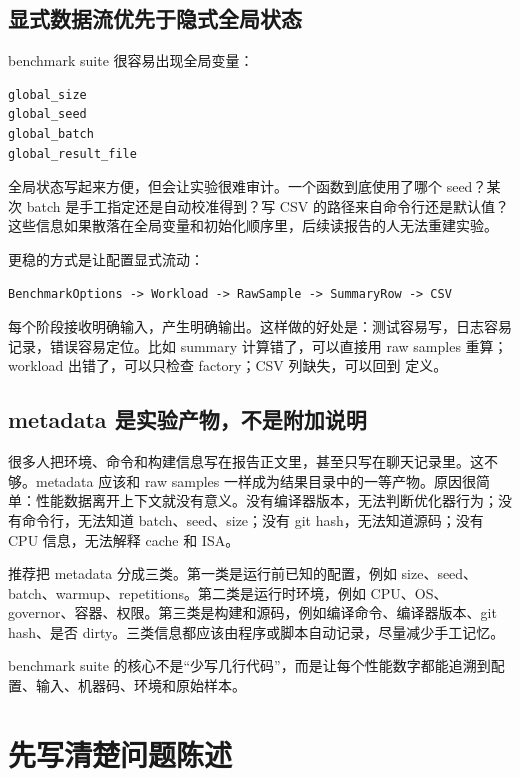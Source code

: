 \subsection{显式数据流优先于隐式全局状态}

benchmark suite 很容易出现全局变量：

\begin{lstlisting}
global_size
global_seed
global_batch
global_result_file
\end{lstlisting}

全局状态写起来方便，但会让实验很难审计。一个函数到底使用了哪个 seed？某次 batch 是手工指定还是自动校准得到？写 CSV 的路径来自命令行还是默认值？这些信息如果散落在全局变量和初始化顺序里，后续读报告的人无法重建实验。

更稳的方式是让配置显式流动：

\begin{lstlisting}
BenchmarkOptions -> Workload -> RawSample -> SummaryRow -> CSV
\end{lstlisting}

每个阶段接收明确输入，产生明确输出。这样做的好处是：测试容易写，日志容易记录，错误容易定位。比如 summary 计算错了，可以直接用 raw samples 重算；workload 出错了，可以只检查 factory；CSV 列缺失，可以回到  定义。

\subsection{metadata 是实验产物，不是附加说明}

很多人把环境、命令和构建信息写在报告正文里，甚至只写在聊天记录里。这不够。metadata 应该和 raw samples 一样成为结果目录中的一等产物。原因很简单：性能数据离开上下文就没有意义。没有编译器版本，无法判断优化器行为；没有命令行，无法知道 batch、seed、size；没有 git hash，无法知道源码；没有 CPU 信息，无法解释 cache 和 ISA。

推荐把 metadata 分成三类。第一类是运行前已知的配置，例如 size、seed、batch、warmup、repetitions。第二类是运行时环境，例如 CPU、OS、governor、容器、权限。第三类是构建和源码，例如编译命令、编译器版本、git hash、是否 dirty。三类信息都应该由程序或脚本自动记录，尽量减少手工记忆。

\begin{keyidea}
benchmark suite 的核心不是“少写几行代码”，而是让每个性能数字都能追溯到配置、输入、机器码、环境和原始样本。
\end{keyidea}

\section{先写清楚问题陈述}

